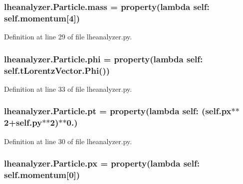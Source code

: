 \subsubsection[{mass}]{\setlength{\rightskip}{0pt plus 5cm}lheanalyzer.\-Particle.\-mass = property(lambda self\-: self.\-momentum\mbox{[}4\mbox{]})\hspace{0.3cm}{\ttfamily [static]}}\label{classlheanalyzer_1_1Particle_a8036328b841efce9867c607010b77208}


Definition at line 29 of file lheanalyzer.\-py.

\subsubsection[{phi}]{\setlength{\rightskip}{0pt plus 5cm}lheanalyzer.\-Particle.\-phi = property(lambda self\-: self.\-t\-Lorentz\-Vector.\-Phi())\hspace{0.3cm}{\ttfamily [static]}}\label{classlheanalyzer_1_1Particle_ae732c25b7618992ffbdc2dbc3621f425}


Definition at line 33 of file lheanalyzer.\-py.

\subsubsection[{pt}]{\setlength{\rightskip}{0pt plus 5cm}lheanalyzer.\-Particle.\-pt = property(lambda self\-: (self.\-px$\ast$$\ast$2+self.\-py$\ast$$\ast$2)$\ast$$\ast$0.)\hspace{0.3cm}{\ttfamily [static]}}\label{classlheanalyzer_1_1Particle_adbd412eff8a9c56b420e90cbefb080e2}


Definition at line 30 of file lheanalyzer.\-py.

\subsubsection[{px}]{\setlength{\rightskip}{0pt plus 5cm}lheanalyzer.\-Particle.\-px = property(lambda self\-: self.\-momentum\mbox{[}0\mbox{]})\hspace{0.3cm}{\ttfamily [static]}}\label{classlheanalyzer_1_1Particle_a4206becef189fb59b6ef8821a2cd9ad9}



